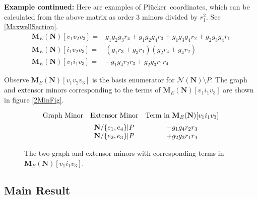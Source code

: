 \documentclass[12pt]{article}
\theoremstyle{definition}
\newcommand{\ext}[1]{\ensuremath{\mathbf{#1}}}
\newcommand{\Plucker}{Pl\"{u}cker\ }
\begin{document}
\textbf{Example continued:}
Here are examples of \Plucker coordinates, which can be calculated from
the above matrix as order 3 minors divided by $r_1^2$.
See \textsection \ref{MaxwellSection}.
\begin{eqnarray*}
\ext{M}_E(\ext{N})[v_1v_2v_3]=&g_1g_2g_3r_4+g_1g_2g_4r_3+g_1g_3g_4r_2+g_2g_3g_4r_1 \\
\ext{M}_E(\ext{N})[i_1v_2v_3]=&(g_1r_3+g_3r_1)(g_2r_4+g_4r_2) \\
\ext{M}_E(\ext{N})[v_1i_1v_3]=&-g_1g_4r_2r_3+g_2g_3r_1r_4
\end{eqnarray*}

Observe $\ext{M}_E(\ext{N})[v_1v_2v_3]$ 
is the basis enumerator for $\mathcal{N}(\ext{N})\setminus P$.
The graph and extensor minors corresponding to the terms
of $\ext{M}_E(\ext{N})[v_1i_1v_3]$ are shown in figure \ref{2MinFig}.
\begin{figure}
\[
\begin{array}{ccc}
\text{Graph Minor} & \text{Extensor Minor} & 
\text{Term in } \ext{M}_E(\ext{N})[v_1i_1v_3] \\[.5em]
\parbox[c]{1in}{} & \ext{N}/\{e_1,e_4\}|P & -g_1g_4r_2r_3    \\
\parbox[c]{1in}{} & \ext{N}/\{e_2,e_3\}|P & +g_2g_3r_1r_4 
\end{array}
\]
\caption{The two graph and extensor minors with corresponding terms
in $\ext{M}_E(\ext{N})[v_1i_1v_3]$.}
\label{Pairs2MinFig}
\end{figure}

\subsection{Main Result}
\end{document}
